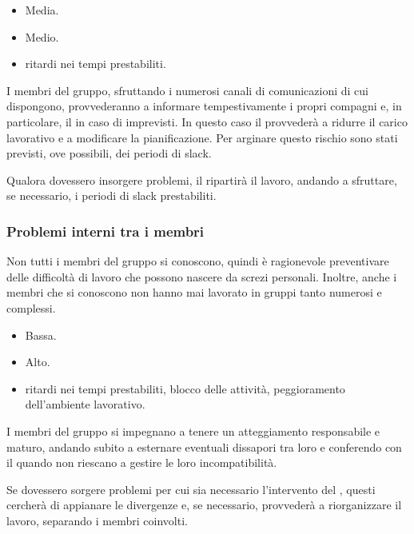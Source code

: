 \documentclass[a4paper, titlepage]{article}
\begin{document}
	\begin{itemize}
		\item {} Media.
		\item {} Medio.
		\item {} ritardi nei tempi prestabiliti.
	\end{itemize}
	
	I membri del gruppo, sfruttando i numerosi canali di comunicazioni di cui dispongono, provvederanno a informare tempestivamente i propri compagni e, in particolare, il  in caso di imprevisti. In questo caso il  provvederà a ridurre il carico lavorativo e a modificare la pianificazione. Per arginare questo rischio sono stati previsti, ove possibili, dei periodi di slack.
	
	Qualora dovessero insorgere problemi, il  ripartirà il lavoro, andando a sfruttare, se necessario, i periodi di slack prestabiliti. 
	
	\subsubsection{Problemi interni tra i membri}
	Non tutti i membri del gruppo si conoscono, quindi è ragionevole preventivare delle difficoltà di lavoro che possono nascere da screzi personali. Inoltre, anche i membri che si conoscono non hanno mai lavorato in gruppi tanto numerosi e complessi.
	
	\begin{itemize}
		\item {} Bassa.
		\item {} Alto.
		\item {} ritardi nei tempi prestabiliti, blocco delle attività, peggioramento dell'ambiente lavorativo.
	\end{itemize}
	
	I membri del gruppo si impegnano a tenere un atteggiamento responsabile e maturo, andando subito a esternare eventuali dissapori tra loro e conferendo con il  quando non riescano a gestire le loro incompatibilità.
	
	Se dovessero sorgere problemi per cui sia necessario l'intervento del , questi cercherà di appianare le divergenze e, se necessario, provvederà a riorganizzare il lavoro, separando i membri coinvolti.
	
\end{document}
